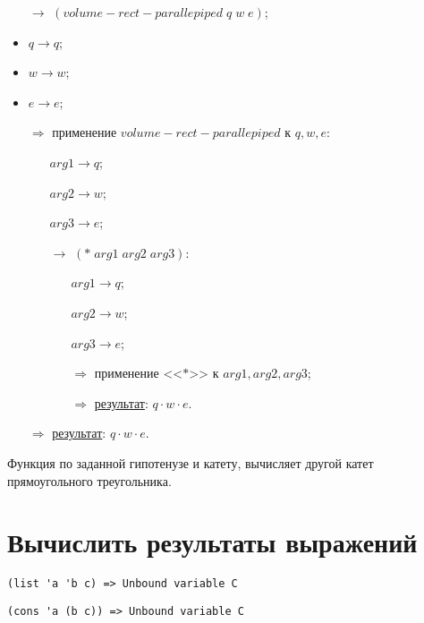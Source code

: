 \begin{itemize}
	\item[$\longrightarrow$] $(volume\!-\!rect\!-\!parallepiped\; q\; w\; e)$;
	\item $q \to q$;
	\item $w \to w$;
	\item $e \to e$;
	\item[$\Longrightarrow$] применение $volume\!-\!rect\!-\!parallepiped$ к $q, w, e$:
	\begin{itemize}
		\item[\textbullet] $arg1 \to q$;
		\item[\textbullet] $arg2 \to w$;
		\item[\textbullet] $arg3 \to e$;
		\item[$\longrightarrow$] $(*\; arg1\; arg2\; arg3)$:
		\begin{itemize}
			\item[\textbullet] $arg1 \to q$;
			\item[\textbullet] $arg2 \to w$;
			\item[\textbullet] $arg3 \to e$;
			\item[$\Longrightarrow$] применение <<$*$>> к $arg1, arg2, arg3$;
			\item[$\Longrightarrow$] \underline{результат}: $q \cdot w \cdot e$.
		\end{itemize}
	\end{itemize}
	\item[$\Longrightarrow$] \underline{результат}: $q \cdot w \cdot e$.
\end{itemize}


\problem Функция по заданной гипотенузе и катету, вычисляет другой катет прямоугольного треугольника.



\section{Вычислить результаты выражений}

\problem \hfill

\begin{lstlisting}
(list 'a 'b c) => Unbound variable C
\end{lstlisting}


\problem \hfill

\begin{lstlisting}
(cons 'a (b c)) => Unbound variable C
\end{lstlisting}


